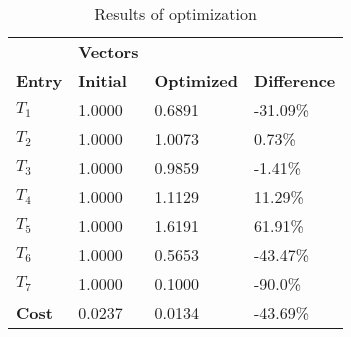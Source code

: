 \begin{table}[H]
\centering
\begin{tabular}{llll}
\textbf{}      & \cellcolor[HTML]{EFEFEF}\textbf{Vectors} & \textbf{} & \textbf{}         \\
\rowcolor[HTML]{EFEFEF} 
\textbf{Entry} & \textbf{Initial} & \textbf{Optimized} & \textbf{Difference} \\
$T_1$ & 1.0000 & 0.6891 & -31.09\% \\ 
$T_2$ & 1.0000 & 1.0073 & 0.73\% \\ 
$T_3$ & 1.0000 & 0.9859 & -1.41\% \\ 
$T_4$ & 1.0000 & 1.1129 & 11.29\% \\ 
$T_5$ & 1.0000 & 1.6191 & 61.91\% \\ 
$T_6$ & 1.0000 & 0.5653 & -43.47\% \\ 
$T_7$ & 1.0000 & 0.1000 & -90.0\% \\ 
\rowcolor[HTML]{EFEFEF} 
\textbf{Cost}  & 0.0237 & 0.0134 & -43.69\% \\ 
\end{tabular}
\caption{Results of optimization}
\label{tab:OptimizationAnalysis}
\end{table}